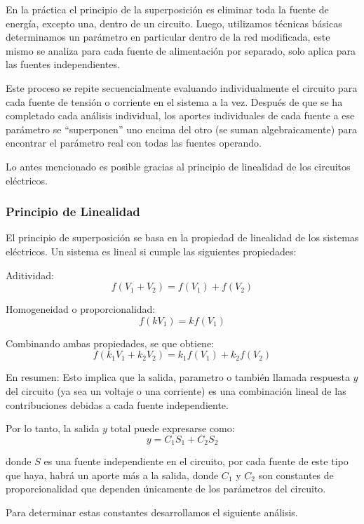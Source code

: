 \documentclass{article}
\begin{document}
    En la práctica el principio de la superposición es eliminar toda la fuente de energía, excepto una, dentro de un circuito. Luego, utilizamos técnicas básicas determinamos un parámetro en particular dentro de la red modificada, este mismo se analiza para cada fuente de alimentación por separado, solo aplica para las fuentes independientes.


    Este proceso se repite secuencialmente evaluando individualmente el circuito para cada fuente de tensión o corriente en el sistema a la vez. Después de que se ha completado cada análisis individual, los aportes individuales de cada fuente a ese parámetro se “superponen” uno encima del otro (se suman algebraicamente) para encontrar el parámetro real con todas las fuentes operando.
    
    Lo antes mencionado es posible gracias al principio de linealidad de los circuitos eléctricos.

    \subsubsection{Principio de Linealidad}
    El principio de superposición se basa en la propiedad de linealidad de los sistemas eléctricos. Un sistema es lineal si cumple las siguientes propiedades:

    Aditividad:
    \[
        f(V_1 + V_2) = f(V_1) + f(V_2)
    \]

    Homogeneidad o proporcionalidad:
    \[
        f(kV_1) = kf(V_1)
    \]

    Combinando ambas propiedades, se que obtiene:
    \[
        f(k_1V_1 + k_2 V_2) = k_1 f(V_1) + k_2 f(V_2)
    \]

    En resumen: 
    Esto implica que la salida, parametro o también llamada respuesta $y$ del circuito (ya sea un voltaje o una corriente) es una combinación lineal de las contribuciones debidas a cada fuente independiente.

    Por lo tanto, la salida $y$ total puede expresarse como:
    \[
        y = C_1 S_1 + C_2 S_2
    \]

    donde $S$ es una fuente independiente en el circuito, por cada fuente de este tipo que haya, habrá un aporte más a la salida, donde $C_1$ y $C_2$ son constantes de proporcionalidad que dependen únicamente de los parámetros del circuito.

    Para determinar estas constantes desarrollamos el siguiente análisis.
\end{document}
